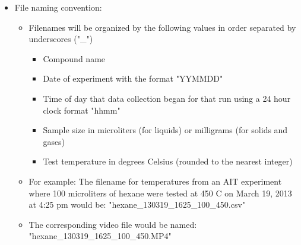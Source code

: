 \documentclass[letterpaper,11pt]{article}
\begin{document}
\begin{itemize}
    \item File naming convention:
        \begin{itemize}
        \item Filenames will be organized by the following values in order 
            separated by underscores ("\_")
                \begin{itemize}
                \item Compound name
                \item Date of experiment with the format "YYMMDD"
                \item Time of day that data collection began for that run
                    using a 24 hour clock format "hhmm"
                \item Sample size in microliters (for liquids) or milligrams
                    (for solids and gases)
                \item Test temperature in degrees Celsius (rounded to the 
                    nearest integer)
                \end{itemize}
        
        \item For example: The filename for temperatures from an AIT experiment  
            where 100 microliters of hexane were tested at 450
            \degree C on March 19, 2013 at 4:25 pm would be: \newline 
            "hexane\_130319\_1625\_100\_450.csv" \newline
        \item The corresponding video file would be named:\newline
            "hexane\_130319\_1625\_100\_450.MP4" 
        \end{itemize}
    \end{itemize}
\end{document}
